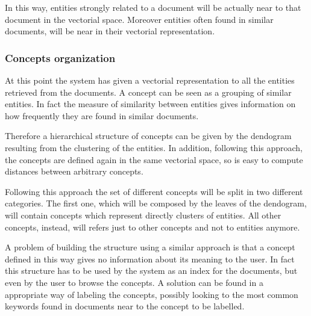 \documentclass{acm_proc_article-sp-sigmod07}
\begin{document}
In this way, entities strongly related to a document will be actually near
to that document in the vectorial space. Moreover entities often found in
similar documents, will be near in their vectorial representation.

\subsubsection{Concepts organization}
At this point the system has given a vectorial representation to all the
entities retrieved from the documents. A concept can be seen as a grouping
of similar entities. In fact the measure of similarity between entities
gives information on how frequently they are found in similar documents.

Therefore a hierarchical structure of concepts can be given by the
dendogram resulting from the clustering of the entities.
In addition, following this approach, the concepts are defined again in
the same vectorial space, so is easy to compute distances between
arbitrary concepts.

Following this approach the set of different concepts will be split in two
different categories. The first one, which will be composed by the leaves
of the dendogram, will contain concepts which represent directly clusters
of entities. All other concepts, instead, will refers just to other
concepts and not to entities anymore.

A problem of building the structure using a similar approach is that a
concept defined in this way gives no information about its meaning to the
user.
In fact this structure has to be used by the system as an index for the
documents, but even by the user to browse the concepts.
A solution can be found in a appropriate way of labeling the concepts,
possibly looking to the most common keywords found in documents near to
the concept to be labelled. 






\newpage
\null
\newpage
\end{document}
